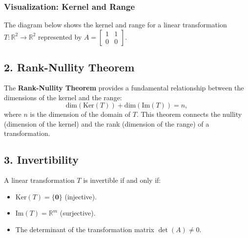 \documentclass[11pt]{article}
\begin{document}
\subsubsection*{Visualization: Kernel and Range}

The diagram below shows the kernel and range for a linear transformation \( T: \mathbb{R}^2 \to \mathbb{R}^2 \) represented by \( A = \begin{bmatrix} 1 & 1 \\ 0 & 0 \end{bmatrix} \).

\begin{center}
\end{center}


\subsection*{2. Rank-Nullity Theorem}

The \textbf{Rank-Nullity Theorem} provides a fundamental relationship between the dimensions of the kernel and the range:
\[
\text{dim}(\text{Ker}(T)) + \text{dim}(\text{Im}(T)) = n,
\]
where \( n \) is the dimension of the domain of \( T \). This theorem connects the nullity (dimension of the kernel) and the rank (dimension of the range) of a transformation.

\subsection*{3. Invertibility}

A linear transformation \( T \) is invertible if and only if:
\begin{itemize}
    \item \( \text{Ker}(T) = \{\mathbf{0}\} \) (injective).
    \item \( \text{Im}(T) = \mathbb{R}^m \) (surjective).
    \item The determinant of the transformation matrix \( \det(A) \neq 0 \).
\end{itemize}
\end{document}
